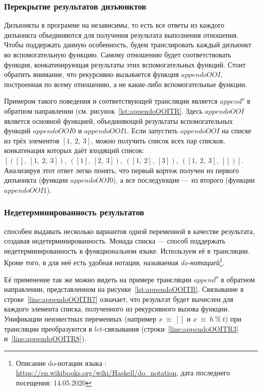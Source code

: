 \subsubsection{Перекрытие результатов дизъюнктов}

Дизъюнкты в программе на \miniKanren{} независимы, то есть все ответы из каждого дизъюнкта объединяются для получения результата выполнения отношения.
Чтобы поддержать данную особенность, будем транслировать каждый дизъюнкт во вспомогательную функцию.
Самому отношению будет соответствовать функция, конкатенирующая результаты этих вспомогательных функций.
Стоит обратить внимание, что рекурсивно вызывается функция $appendoOOI$, построенная по всему отношению, а не какие-либо вспомогательные функции.

Примером такого поведения и соответствующей трансляции является $append^o$ в обратном направлении (см. рисунок~\ref{lst:appendoOOITR}.
Здесь $appendoOOI$ является основной функцией, объединяющей результаты вспомогательных функций $appendoOOI0$ и $appendoOOI1$.
Если запустить $appendoOOI$ на списке из трёх элементов $[1,~2,~3]$, можно получить список всех пар списков, конкатенация которых даёт входящий список: \\ $[([],~[1,~2,~3]),~([1],~[2,~3]),~([1,~2],~[3]),~([1,~2,~3],~[])]$.
Анализируя этот ответ легко понять, что первый кортеж получен из первого дизъюнкта (функции $appendoOOI0$), а все последующие --- из второго (функции $appendoOOI1$).


\subsubsection{Недетерминированность результатов}

\miniKanren{} способен выдавать несколько вариантов одной переменной в качестве результата, создавая недетерминированность.
Монада списка --- способ поддержать недетерминированность в функциональном языке.
Используем её в трансляции.
Кроме того, в \haskell{} для неё есть удобная нотация, называемая \emph{do-нотацией}\footnote{Описание do-нотации языка \haskell{}: \url{https://en.wikibooks.org/wiki/Haskell/do\_notation}, дата последнего посещения: 14.05.2020}.

Её применение так же можно видеть на примере трансляции $append^o$ в обратном направлении, представленном на рисунке~\ref{lst:appendoOOITR}.
Связывание в строке~\ref{line:appendoOOITR7} означает, что результат будет вычислен для каждого элемента списка, полученного из рекурсивного вызова функции.
Унификации неизвестных переменных (например $x~\equiv~[]$ и $x~\equiv~h~\%~t$) при трансляции преобразуются в $let$-связывания (строки~\ref{line:appendoOOITR3} и~\ref{line:appendoOOITR8}). 

